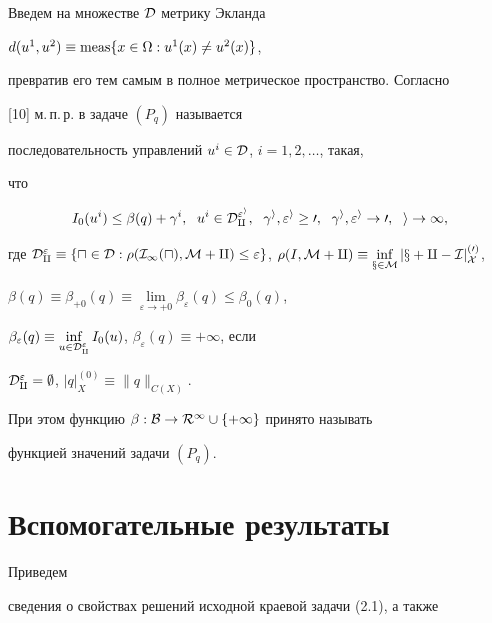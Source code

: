  


Введем на множестве $\cal D$ метрику Экланда 


$d(u^1,u^2)\equiv\operatorname{meas}\{x\in\Omega: u^1(x)\ne u^2(x)\}$, 


превратив его тем самым в полное метрическое пространство. Согласно 


[10] м.\,п.\,р. в задаче $(P_q)$ называется 


последовательность управлений $u^i\in\cal D$, $i=1,2,\dotsc$, такая, 


что 


\begin{equation} 


I_0(u^i)\le\beta(q)+\gamma^i,\ \; u^i\in\cal D^{\varepsilon^i}_q, 


\ \; \gamma^i,\varepsilon^i\ge0,\ \; 


\gamma^i,\varepsilon^i\to0,\ \; i\to\infty, 


\end{equation} 


где $\cal D^\varepsilon_q\equiv\{u\in\cal D:\rho(I_1(u),\cal 


M+q)\le\varepsilon\}$, $\rho(I,\cal M+q)\equiv\inf\limits_{x\in\cal 


M}|x+q-I|^{(0)}_X$, 


$\beta(q)\equiv\beta_{+0}(q)\equiv\lim\limits_{\varepsilon\to+0} 


\beta_\varepsilon(q)\le\beta_0(q)$, 


$\beta_\varepsilon(q)\equiv\inf\limits_{u\in\cal 


D^\varepsilon_q}I_0(u)$, $\beta_\varepsilon(q)\equiv+\infty$, если 


$\cal D^\varepsilon_q=\emptyset$, $|q|^{(0)}_X\equiv\|q\|_{C(X)}$. 


При этом функцию $\beta:\cal B\to R^1\cup\{+\infty\}$ принято называть 


функцией значений задачи $(P_q)$. 


 


\section{Вспомогательные результаты} 


 


Приведем 


сведения о свойствах решений исходной краевой задачи (2.1), а также 


